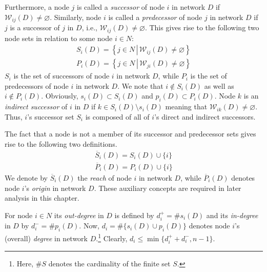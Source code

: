 Furthermore, a node $j$ is called a \emph{successor} of node $i$ in network $D$ if $\mathcal{W}_{ij} (D) \neq \varnothing$. Similarly, node $i$ is called a \textit{predecessor} of node $j$ in network $D$ if $j$ is a successor of $j$ in $D$, i.e., $\mathcal{W}_{ij} (D) \neq \varnothing$. This gives rise to the following two node sets in relation to some node $i \in N \colon$
\begin{gather}
	S_i (D)= \left\{ j \in N \, \left| \, \mathcal{W}_{ij}(D) \neq \varnothing \right. \right\} \\[1.5ex]
	P_i (D)= \left\{ j \in N \, \left| \, \mathcal{W}_{ji}(D) \neq \varnothing \right. \right\}
\end{gather}
$S_i$ is the set of successors of node $i$ in network $D$, while $P_i$ is the set of predecessors of node $i$ in network $D$. We note that $i \notin S_i(D)$ as well as $i \notin P_i (D)$. Obviously, $s_i (D) \subset S_i (D)$ and $p_i (D) \subset P_i (D)$. Node $k$ is an \emph{indirect successor} of $i$ in $D$ if $k \in S_{i}(D) \setminus s_i (D)$ meaning that $\mathcal{W}_{ik}(D) \neq \varnothing$. Thus, $i$'s successor set $S_i$ is composed of all of $i$'s direct and indirect successors.

The fact that a node is not a member of its successor and predecessor sets gives rise to the following two definitions.
\begin{gather}
	\overline{S}_{i}(D) = S_{i}(D) \cup \{i\} \\[1.5ex]
	\overline{P}_{i}(D) = P_{i}(D) \cup \{i\}
\end{gather}
We denote by $\overline{S}_{i}(D)$ the \emph{reach} of node $i$ in network $D$, while $\overline{P}_{i}(D)$ denotes node $i$'s \emph{origin} in network $D$. These auxiliary concepts are required in later analysis in this chapter.

For node $i \in N$ its \emph{out-degree} in $D$ is defined by $d_{i}^{+} = \# s_{i}(D)$ and its \emph{in-degree} in $D$ by $d_{i}^{-}= \# p_{i}(D)$. Now, $d_{i} = \# \{ s_{i} (D) \cup p_{i} (D) \}$ denotes node $i$'s (overall) \emph{degree} in network $D$.\footnote{Here, $\# S$ denotes the cardinality of the finite set $S$.} Clearly, $d_i \leqslant \min \{ d_i^+ + d_i^- , n-1 \}$.

